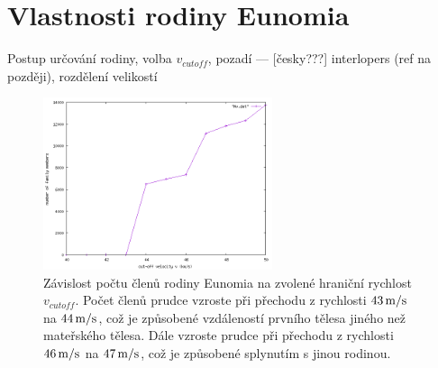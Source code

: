 \documentclass[A4paper, 12pt, oneside]{book}
\begin{document}
\chapter{Vlastnosti rodiny Eunomia}
Postup určování rodiny, volba $v_{cutoff}$, pozadí --- [česky???] interlopers (ref na později), rozdělení velikostí 
\begin{figure}[!htb]
	\centering
	\includegraphics[width=0.6\textwidth]{obr/Nv}
	\caption{Závislost počtu členů rodiny Eunomia na zvolené hraniční rychlost $v_{cutoff}$. Počet členů prudce vzroste při přechodu z rychlosti $43\,{\rm m/s}$ na $44\,{\rm m/s}$, což je způsobené vzdáleností prvního tělesa jiného než mateřského tělesa. Dále vzroste prudce při přechodu z rychlosti $46\,{\rm m/s}$ na $47\,{\rm m/s}$, což je způsobené splynutím s jinou rodinou.}
	\label{Nv}
\end{figure}
\end{document}
